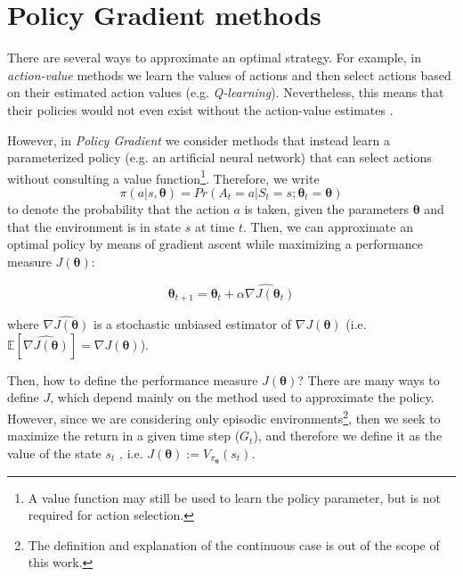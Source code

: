 \documentclass[twoside,twocolumn]{article}
\begin{document}

\section{Policy Gradient methods}

There are several ways to approximate an optimal strategy. For example, in \emph{action-value} methods we learn the values of actions and then select
actions based on their estimated action values (e.g. \textit{Q-learning}). Nevertheless, this means that their policies would not even exist without the action-value estimates \cite{Sutton1998}.

However, in \emph{Policy Gradient} we consider methods that instead learn a parameterized policy (e.g. an artificial neural network) that can select actions without consulting a value function\footnote{A value function may still be used to learn the policy parameter, but is not required for action selection.}.
Therefore, we write
$$\pi(a|s,\boldsymbol{\theta}) = Pr(A_t=a | S_t=s; \boldsymbol{\theta}_t=\boldsymbol{\theta})$$
 to denote the probability that the action $a$ is taken, given the parameters $\boldsymbol{\theta}$ and that the environment is in state $s$ at time $t$.
Then, we can approximate an optimal policy by means of gradient ascent while maximizing a performance measure $J(\boldsymbol{\theta})$:

\begin{equation}
  \boldsymbol{\theta}_{t+1} = \boldsymbol{\theta}_{t} + \widehat{\alpha \nabla J(\boldsymbol{\theta}_t)}
  \label{eq:learn_rule}
\end{equation}

\noindent where $\widehat{\nabla J(\boldsymbol{\theta})}$ is a stochastic unbiased estimator of $\nabla J(\boldsymbol{\theta})$ (i.e. $\mathbb{E}[\widehat{\nabla J(\boldsymbol{\theta})}] = \nabla J(\boldsymbol{\theta})$).

Then, how to define the performance measure $J(\boldsymbol{\theta})$?
There are many ways to define $J$, which depend mainly on the method used to approximate the policy.
However, since we are considering only episodic environments\footnote{The definition and explanation of the continuous case is out of the scope of this work.}, then we seek to maximize the return in a given time step ($G_t$), and therefore we define it as the value of the state $s_t$ , i.e. $J(\boldsymbol{\theta}):=V_{\pi_{\boldsymbol{\theta}}}(s_t)$.
\end{document}
